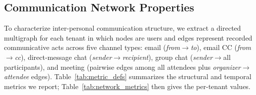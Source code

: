\subsection{Communication Network Properties}
\label{sec:network-stats}

To characterize inter-personal communication structure, we extract a directed multigraph for each tenant in which nodes are users and edges represent recorded communicative acts across five channel types: email (\emph{from}$\to$\emph{to}), email CC (\emph{from}$\to$\emph{cc}), direct-message chat (\emph{sender}$\to$\emph{recipient}), group chat (\emph{sender}$\to$all participants), and meeting (pairwise edges among all attendees plus \emph{organizer}$\to$\emph{attendee} edges). Table~\ref{tab:metric_defs} summarizes the structural and temporal metrics we report; Table~\ref{tab:network_metrics} then gives the per-tenant values.

